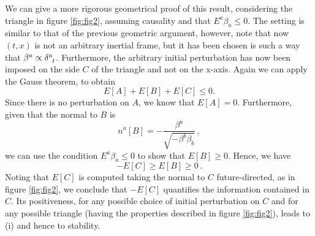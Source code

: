 \documentclass[aps,prl,reprint,nofootinbib]{revtex4-1}
\begin{document}
We can give a more rigorous geometrical proof of this result, considering the triangle in figure \ref{fig:fig2}, assuming causality and that $E^a \beta_a \leq 0$. The setting is similar to that of the previous geometric argument, however, note that now $(t,x)$ is not an arbitrary inertial frame, but it has been chosen is such a way that $\beta^a \propto \delta\indices{^a _t}$. Furthermore, the arbitrary initial perturbation has now been imposed on the side $C$ of the triangle and not on the x-axis. Again we can apply the Gauss theorem, to obtain
\begin{equation}
E[A]+E[B]+E[C] \leq 0.
\end{equation}
Since there is no perturbation on $A$, we know that $E[A]=0$. Furthermore, given that the normal to $B$ is 
\begin{equation}
n^a[B] = - \dfrac{\beta^a}{\sqrt{-\beta^b \beta_b}} \, ,
\end{equation}
we can use the condition $E^a \beta_a \leq 0$ to show that $E[B] \geq 0$. Hence, we have
\begin{equation}
-E[C] \geq E[B] \geq 0 \, .
\end{equation} 
Noting that $E[C]$ is computed taking the normal to $C$ future-directed, as in figure \ref{fig:fig2}, we conclude that $-E[C]$ quantifies the information contained in $C$. Its positiveness, for any possible choice of initial perturbation on $C$ and for any possible triangle (having the properties described in figure \ref{fig:fig2}), leads to (i) and hence to stability.
\end{document}
